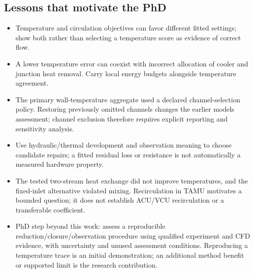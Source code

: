 \subsection{Lessons that motivate the PhD}\label{subsec:lessons-that-motivate-the-phd}
\begin{itemize}[leftmargin=*]
\item Temperature and circulation objectives can favor different fitted settings; show both rather than selecting a temperature score as evidence of correct flow.
\item A lower temperature error can coexist with incorrect allocation of cooler and junction heat removal. Carry local energy budgets alongside temperature agreement.
\item The primary wall-temperature aggregate used a declared channel-selection policy. Restoring previously omitted channels changes the earlier models\textquotesingle{} assessment; channel exclusion therefore requires explicit reporting and sensitivity analysis.
\item Use hydraulic/\allowbreak{}thermal development and observation meaning to choose candidate repairs; a fitted residual loss or resistance is not automatically a measured hardware property.
\item The tested two-stream heat exchange did not improve temperatures, and the fixed-inlet alternative violated mixing. Recirculation in TAMU motivates a bounded question; it does not establish ACU/\allowbreak{}VCU recirculation or a transferable coefficient.
\item PhD step beyond this work: assess a reproducible reduction/\allowbreak{}closure/\allowbreak{}observation procedure using qualified experiment and CFD evidence, with uncertainty and unused assessment conditions. Reproducing a temperature trace is an initial demonstration; an additional method benefit or supported limit is the research contribution.
\end{itemize}


